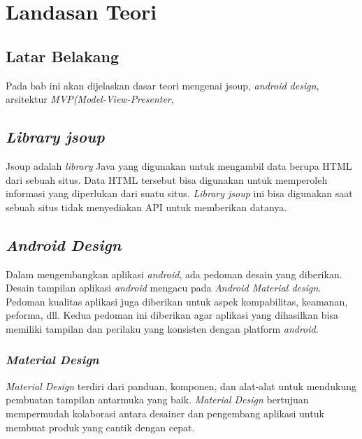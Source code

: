 \chapter{Landasan Teori}
\label{chap:teori}

\section{Latar Belakang}
\label{sec:latar} 
Pada bab ini akan dijelaskan dasar teori mengenai jsoup, \textit{android design}, arsitektur \textit{MVP(Model-View-Presenter},  

\section{\textit{Library jsoup}}
\label{sec:jsoup}
Jsoup adalah \textit{library} Java yang digunakan untuk mengambil data berupa HTML dari sebuah situs. Data HTML tersebut bisa digunakan untuk memperoleh informasi yang diperlukan dari suatu situs\cite{jsoup}. \textit{Library jsoup} ini bisa digunakan saat sebuah situs tidak menyediakan API untuk memberikan datanya.  


\section{\textit{Android Design}}
\label{sec:android design}
Dalam mengembangkan aplikasi \textit{android}, ada pedoman desain yang diberikan. Desain tampilan aplikasi \textit{android} mengacu pada \textit{Android Material design}. Pedoman kualitas aplikasi juga diberikan untuk aspek kompabilitas, keamanan, peforma, dll. Kedua pedoman ini diberikan agar aplikasi yang dihasilkan bisa memiliki tampilan dan perilaku yang konsisten dengan platform \textit{android}. 
 
\subsection{\textit{Material Design}}
\textit{Material Design} terdiri dari panduan, komponen, dan alat-alat untuk mendukung pembuatan tampilan antarmuka yang baik. \textit{Material Design} bertujuan mempermudah kolaborasi antara desainer dan pengembang aplikasi untuk membuat produk yang cantik dengan cepat\cite{materialdesign}.
